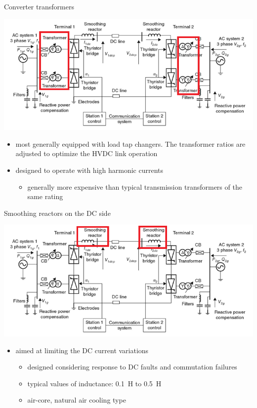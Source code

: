 \begin{frame}{Converter transformers}
\begin{center}
    \includegraphics[width=0.5\linewidth]{images/typical-HVDC2.png}
\end{center}
\begin{itemize}
    \item most generally equipped with load tap changers. The transformer ratios are adjusted to optimize the HVDC link operation
    \item designed to operate with high harmonic currents
    \begin{itemize}
        \item generally more expensive than typical transmission transformers of the same rating
    \end{itemize}
\end{itemize}
\end{frame}

\begin{frame}{Smoothing reactors on the DC side}
\begin{center}
    \includegraphics[width=0.5\linewidth]{images/typical-HVDC3.png}
\end{center}
\begin{itemize}
    \item aimed at limiting the DC current variations
    \begin{itemize}
        \item designed considering response to DC faults and commutation failures
        \item typical values of inductance: \SI{0.1}{H} to \SI{0.5}{H}
        \item air-core, natural air cooling type
    \end{itemize}
\end{itemize}
\end{frame}


